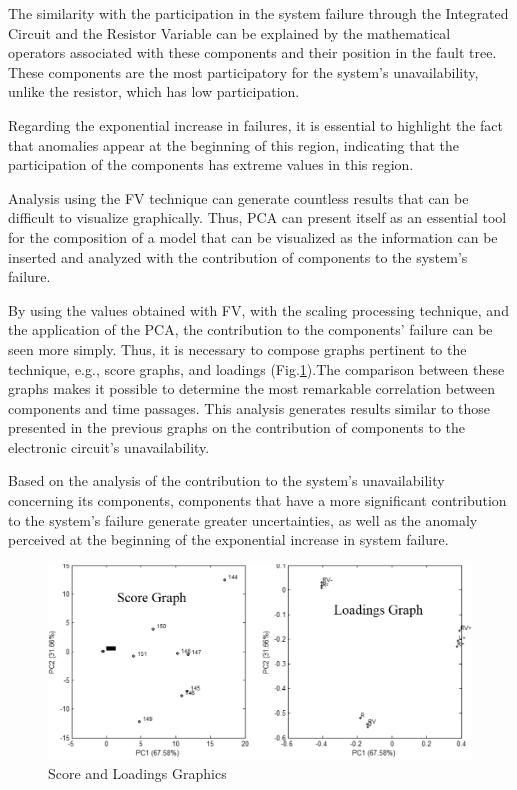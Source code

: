 \documentclass{ws-m3as}
\begin{document}
The similarity with the participation in the system failure through the Integrated Circuit and the Resistor Variable can be explained by the mathematical operators associated with these components and their position in the fault tree. These components are the most participatory for the system's unavailability, unlike the resistor, which has low participation. 

Regarding the exponential increase in failures, it is essential to highlight the fact that anomalies appear at the beginning of this region, indicating that the participation of the components has extreme values in this region.

Analysis using the FV technique can generate countless results that can be difficult to visualize graphically. Thus, PCA can present itself as an essential tool for the composition of a model that can be visualized as the information can be inserted and analyzed with the contribution of components to the system's failure.

By using the values obtained with FV, with the scaling processing technique, and the application of the PCA, the contribution to the components' failure can be seen more simply. Thus, it is necessary to compose graphs pertinent to the technique, e.g., score graphs, and loadings (Fig.\ref{fig:16}).The comparison between these graphs makes it possible to determine the most remarkable correlation between components and time passages. This analysis generates results similar to those presented in the previous graphs on the contribution of components to the electronic circuit's unavailability.

Based on the analysis of the contribution to the system's unavailability concerning its components, components that have a more significant contribution to the system's failure generate greater uncertainties, as well as the anomaly perceived at the beginning of the exponential increase in system failure.

\begin{figure}[H]
	\centering
	\includegraphics[width=1\linewidth]{Figures/ScorexLoadings.png}
	\caption{Score and Loadings Graphics}
	\label{fig:fvloadings}
	\label{fig:16}
\end{figure}
\end{document}
